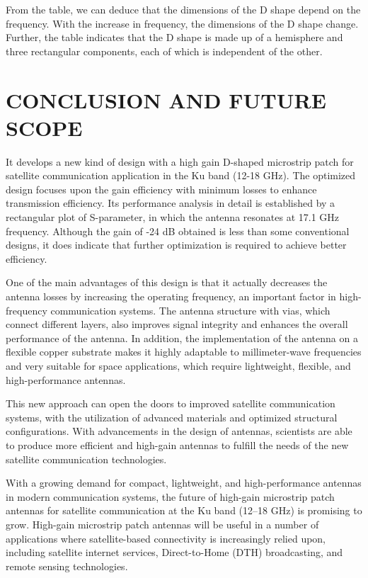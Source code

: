 \documentclass[12pt]{article}
\begin{document}
From the table, we can deduce that the dimensions of the D shape depend on the frequency. With the increase in frequency, the dimensions of the D shape change. Further, the table indicates that the D shape is made up of a hemisphere and three rectangular components, each of which is independent of the other.


\newpage
\section{CONCLUSION AND FUTURE SCOPE}
\par It develops a new kind of design with a high gain D-shaped microstrip patch for satellite communication application in the Ku band (12-18 GHz). The optimized design focuses upon the gain efficiency with minimum losses to enhance transmission efficiency. Its performance analysis in detail is established by a rectangular plot of S-parameter, in which the antenna resonates at 17.1 GHz frequency. Although the gain of -24 dB obtained is less than some conventional designs, it does indicate that further optimization is required to achieve better efficiency.\\

\par One of the main advantages of this design is that it actually decreases the antenna losses by increasing the operating frequency, an important factor in high-frequency communication systems. The antenna structure with vias, which connect different layers, also improves signal integrity and enhances the overall performance of the antenna. In addition, the implementation of the antenna on a flexible copper substrate makes it highly adaptable to millimeter-wave frequencies and very suitable for space applications, which require lightweight, flexible, and high-performance antennas.\\

\par This new approach can open the doors to improved satellite communication systems, with the utilization of advanced materials and optimized structural configurations. With advancements in the design of antennas, scientists are able to produce more efficient and high-gain antennas to fulfill the needs of the new satellite communication technologies.\\

\par With a growing demand for compact, lightweight, and high-performance antennas in modern communication systems, the future of high-gain microstrip patch antennas for satellite communication at the Ku band (12–18 GHz) is promising to grow. High-gain microstrip patch antennas will be useful in a number of applications where satellite-based connectivity is increasingly relied upon, including satellite internet services, Direct-to-Home (DTH) broadcasting, and remote sensing technologies.\\
\end{document}
